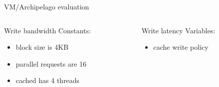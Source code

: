 \begin{frame}{VM/Archipelago evaluation}
	\begin{columns}[t]
		\begin{column}{.5\textwidth}
			Write bandwidth
			Constants:
			\begin{itemize}
				\item block size is 4KB
				\item parallel requests are 16
				\item cached has 4 threads
			\end{itemize}
		\end{column}
		\begin{column}{.5\textwidth}
			Write latency
			Variables:
			\begin{itemize}
				\item cache write policy
			\end{itemize}
		\end{column}
	\end{columns}
\end{frame}




